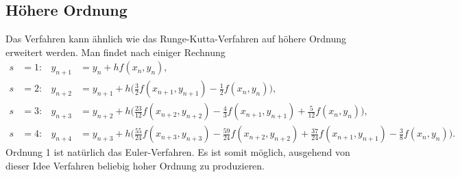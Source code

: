 \subsection{Höhere Ordnung
\label{buch:ode:subsection:hoehereordnung}}
Das Verfahren kann ähnlich wie das Runge-Kutta-Verfahren auf höhere
Ordnung erweitert werden.
Man findet nach einiger Rechnung
\begin{align*}
s&=1\colon&
y_{n+1}
&=
y_n+hf(x_n,y_n),
\\
s&=2\colon&
y_{n+2}
&=
y_{n+1}+h\biggl(\frac32f(x_{n+1},y_{n+1})-\frac12f(x_n,y_n)\biggr),
\\
s&=3\colon&
y_{n+3}
&=
y_{n+2}+h\biggl(\frac{23}{12}f(x_{n+2},y_{n+2})-\frac43f(x_{n+1},y_{n+1})+\frac{5}{12}f(x_n,y_n)\biggr),
\\
s&=4\colon&
y_{n+4}
&=
y_{n+3}+h\biggl(\frac{55}{24}f(x_{n+3},y_{n+3})
	-\frac{59}{24}f(x_{n+2},y_{n+2})
	+\frac{37}{24}f(x_{n+1},y_{n+1})
	-\frac{3}{8}f(x_n,y_n)
\biggr).
\end{align*}
Ordnung 1 ist natürlich das Euler-Verfahren.
Es ist somit möglich, ausgehend von dieser Idee Verfahren beliebig hoher
Ordnung zu produzieren.

